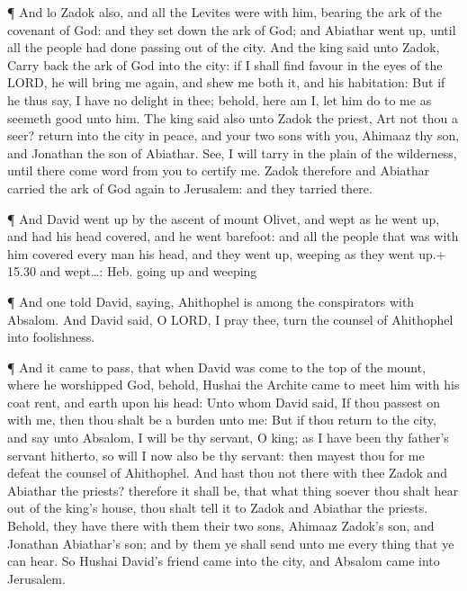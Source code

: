  ¶ And lo Zadok also, and all the Levites were with him,
bearing the ark of the covenant of God: and they set down the ark of
God; and Abiathar went up, until all the people had done passing out of
the city.  And the king said unto Zadok, Carry back the ark
of God into the city: if I shall find favour in the eyes of the LORD, he
will bring me again, and shew me both it, and his habitation:
 But if he thus say, I have no delight in thee; behold,
here am I, let him do to me as seemeth good unto him.  The
king said also unto Zadok the priest, Art not thou a seer? return into
the city in peace, and your two sons with you, Ahimaaz thy son, and
Jonathan the son of Abiathar.  See, I will tarry in the
plain of the wilderness, until there come word from you to certify me.
 Zadok therefore and Abiathar carried the ark of God again
to Jerusalem: and they tarried there.

 ¶ And David went up by the ascent of mount Olivet, and
wept as he went up, and had his head covered, and he went barefoot: and
all the people that was with him covered every man his head, and they
went up, weeping as they went up.+ 15.30 and wept\ldots: Heb. going up
and weeping

 ¶ And one told David, saying, Ahithophel is among the
conspirators with Absalom. And David said, O LORD, I pray thee, turn the
counsel of Ahithophel into foolishness.

 ¶ And it came to pass, that when David was come to the top
of the mount, where he worshipped God, behold, Hushai the Archite came
to meet him with his coat rent, and earth upon his head: 
Unto whom David said, If thou passest on with me, then thou shalt be a
burden unto me:  But if thou return to the city, and say
unto Absalom, I will be thy servant, O king; as I have been thy father's
servant hitherto, so will I now also be thy servant: then mayest thou
for me defeat the counsel of Ahithophel.  And hast thou not
there with thee Zadok and Abiathar the priests? therefore it shall be,
that what thing soever thou shalt hear out of the king's house, thou
shalt tell it to Zadok and Abiathar the priests.  Behold,
they have there with them their two sons, Ahimaaz Zadok's son, and
Jonathan Abiathar's son; and by them ye shall send unto me every thing
that ye can hear.  So Hushai David's friend came into the
city, and Absalom came into Jerusalem.


